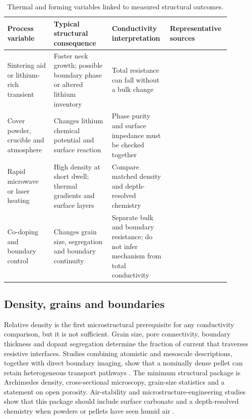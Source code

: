 \begin{table}[t]
\centering
\caption{Thermal and forming variables linked to measured structural outcomes.}
\label{tab:thermal}
\begin{tabular}{P{0.20\linewidth}P{0.25\linewidth}P{0.25\linewidth}P{0.20\linewidth}}
\toprule
Process variable & Typical structural consequence & Conductivity interpretation & Representative sources \\
\midrule
Sintering aid or lithium-rich transient & Faster neck growth; possible boundary phase or altered lithium inventory & Total resistance can fall without a bulk change & \cite{janani2014influence,luo2019influence,park2026li2co3} \\
Cover powder, crucible and atmosphere & Changes lithium chemical potential and surface reaction & Phase purity and surface impedance must be checked together & \cite{k2026influence,saran2024optical,saran2025structural} \\
Rapid microwave or laser heating & High density at short dwell; thermal gradients and surface layers & Compare matched density and depth-resolved chemistry & \cite{aman2026susceptor,ramos2026ultrafast,zhang2024unveiling} \\
Co-doping and boundary control & Changes grain size, segregation and boundary continuity & Separate bulk and boundary resistance; do not infer mechanism from total conductivity & \cite{ahmad2025reducing,golmohammad2024effects,yao2026elimination} \\
\bottomrule
\end{tabular}
\end{table}

\subsection{Density, grains and boundaries}

Relative density is the first microstructural prerequisite for any conductivity comparison, but it is not sufficient. Grain size, pore connectivity, boundary thickness and dopant segregation determine the fraction of current that traverses resistive interfaces. Studies combining atomistic and mesoscale descriptions, together with direct boundary imaging, show that a nominally dense pellet can retain heterogeneous transport pathways \cite{heo2021microstructural,gao2021revealing,yao2026elimination}. The minimum structural package is Archimedes density, cross-sectional microscopy, grain-size statistics and a statement on open porosity. Air-stability and microstructure-engineering studies show that this package should include surface carbonate and a depth-resolved chemistry when powders or pellets have seen humid air \cite{nasir2023li,hoinkis2023particle,uhlenbruck2018reactions}.


